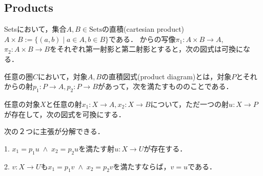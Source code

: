 \documentclass[uplatex, 12pt, dvipdfmx]{jsarticle}
\begin{document}
\subsection{Products}

\begin{proposition*}
    Setsにおいて，集合$A,B\in\mathrm{Sets}$の直積(cartesian product)$A\times B:=\{ (a,b)\mid a\in A,b\in B \}$である．
    からの写像$\pi_1:A\times B\to A$,$\pi_2:A\times B\to B$をそれぞれ第一射影と第二射影とすると，次の図式は可換になる．
    \begin{center}
    \end{center}
\end{proposition*}

\begin{definition}
    任意の圏$C$において，対象$A,B$の直積図式(product diagram)とは，対象$P$とそれからの射$p_1:P\to A, p_2:P\to B$があって，次を満たすもののことである．

    任意の対象$X$と任意の射$x_1:X\to A, x_2:X\to B$について，ただ一つの射$u:X\to P$が存在して，次の図式を可換にする．
    \begin{center}
    \end{center}
\end{definition}
\begin{remark}
    次の２つに主張が分解できる．

    1. $x_1=p_1u\;\land\; x_2=p_2u$を満たす射$u:X\to U$が存在する．

    2. $v:X\to U$も$x_1=p_1v\;\land\; x_2=p_2v$を満たすならば，$v=u$である．
\end{remark}
\end{document}
